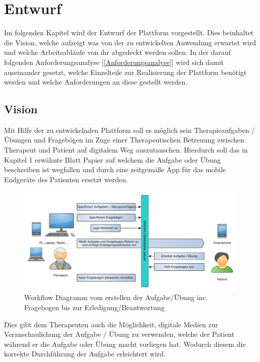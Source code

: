 
\chapter{Entwurf}\label{Entwurf} 
Im folgenden Kapitel wird der Entwurf der Plattform vorgestellt. Dies beinhaltet die Vision, welche aufzeigt was von der zu entwickelten Anwendung erwartet wird und welche Arbeitsabläufe von ihr abgedeckt werden sollen.
In der darauf folgenden Anforderungsanalyse [\ref{Anforderungsanalyse}] wird sich damit auseinander gesetzt, welche Einzelteile zur Realisierung der Plattform benötigt werden und welche Anforderungen an diese gestellt werden. 

\section{Vision}\label{Vision}
Mit Hilfe der zu entwickelnden Plattform soll es möglich sein Therapieaufgaben / Übungen und Fragebögen im Zuge einer Therapeutischen Betreuung zwischen Therapeut und Patient auf digitalem Weg auszutauschen. Hierdurch soll das in Kapitel 1 erwähnte Blatt Papier auf welchem die Aufgabe oder Übung beschreiben ist wegfallen und durch eine zeitgemäße App für das mobile Endgeräte des Patienten ersetzt werden.

\begin{figure}[H]
	\centering
	\includegraphics[scale=0.6]{images/AblaufAbstrakt}
	\caption[Workflow Diagramm vom erstellen der Aufgabe/Übung inc. Fragebogen bis zur Erledigung/Beantwortung]{Workflow Diagramm vom erstellen der Aufgabe/Übung inc. Fragebogen bis zur Erledigung/Beantwortung}
	\label{AblaufAbstrakt}
\end{figure}

Dies gibt dem Therapeuten auch die Möglichkeit, digitale Medien zur Veranschaulichung der Aufgabe / Übung zu verwenden, welche der Patient während er die Aufgabe oder Übung macht vorliegen hat. Wodurch diesem die korrekte Durchführung der Aufgabe erleichtert wird.

